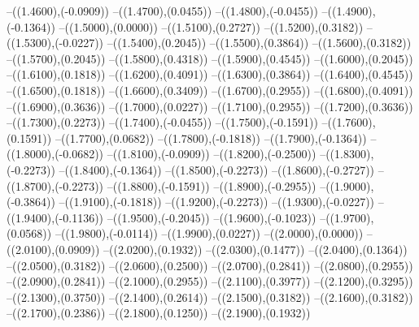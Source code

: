 {	--({\sx*(1.4600)},{\sy*(-0.0909)})
	--({\sx*(1.4700)},{\sy*(0.0455)})
	--({\sx*(1.4800)},{\sy*(-0.0455)})
	--({\sx*(1.4900)},{\sy*(-0.1364)})
	--({\sx*(1.5000)},{\sy*(0.0000)})
	--({\sx*(1.5100)},{\sy*(0.2727)})
	--({\sx*(1.5200)},{\sy*(0.3182)})
	--({\sx*(1.5300)},{\sy*(-0.0227)})
	--({\sx*(1.5400)},{\sy*(0.2045)})
	--({\sx*(1.5500)},{\sy*(0.3864)})
	--({\sx*(1.5600)},{\sy*(0.3182)})
	--({\sx*(1.5700)},{\sy*(0.2045)})
	--({\sx*(1.5800)},{\sy*(0.4318)})
	--({\sx*(1.5900)},{\sy*(0.4545)})
	--({\sx*(1.6000)},{\sy*(0.2045)})
	--({\sx*(1.6100)},{\sy*(0.1818)})
	--({\sx*(1.6200)},{\sy*(0.4091)})
	--({\sx*(1.6300)},{\sy*(0.3864)})
	--({\sx*(1.6400)},{\sy*(0.4545)})
	--({\sx*(1.6500)},{\sy*(0.1818)})
	--({\sx*(1.6600)},{\sy*(0.3409)})
	--({\sx*(1.6700)},{\sy*(0.2955)})
	--({\sx*(1.6800)},{\sy*(0.4091)})
	--({\sx*(1.6900)},{\sy*(0.3636)})
	--({\sx*(1.7000)},{\sy*(0.0227)})
	--({\sx*(1.7100)},{\sy*(0.2955)})
	--({\sx*(1.7200)},{\sy*(0.3636)})
	--({\sx*(1.7300)},{\sy*(0.2273)})
	--({\sx*(1.7400)},{\sy*(-0.0455)})
	--({\sx*(1.7500)},{\sy*(-0.1591)})
	--({\sx*(1.7600)},{\sy*(0.1591)})
	--({\sx*(1.7700)},{\sy*(0.0682)})
	--({\sx*(1.7800)},{\sy*(-0.1818)})
	--({\sx*(1.7900)},{\sy*(-0.1364)})
	--({\sx*(1.8000)},{\sy*(-0.0682)})
	--({\sx*(1.8100)},{\sy*(-0.0909)})
	--({\sx*(1.8200)},{\sy*(-0.2500)})
	--({\sx*(1.8300)},{\sy*(-0.2273)})
	--({\sx*(1.8400)},{\sy*(-0.1364)})
	--({\sx*(1.8500)},{\sy*(-0.2273)})
	--({\sx*(1.8600)},{\sy*(-0.2727)})
	--({\sx*(1.8700)},{\sy*(-0.2273)})
	--({\sx*(1.8800)},{\sy*(-0.1591)})
	--({\sx*(1.8900)},{\sy*(-0.2955)})
	--({\sx*(1.9000)},{\sy*(-0.3864)})
	--({\sx*(1.9100)},{\sy*(-0.1818)})
	--({\sx*(1.9200)},{\sy*(-0.2273)})
	--({\sx*(1.9300)},{\sy*(-0.0227)})
	--({\sx*(1.9400)},{\sy*(-0.1136)})
	--({\sx*(1.9500)},{\sy*(-0.2045)})
	--({\sx*(1.9600)},{\sy*(-0.1023)})
	--({\sx*(1.9700)},{\sy*(0.0568)})
	--({\sx*(1.9800)},{\sy*(-0.0114)})
	--({\sx*(1.9900)},{\sy*(0.0227)})
	--({\sx*(2.0000)},{\sy*(0.0000)})
	--({\sx*(2.0100)},{\sy*(0.0909)})
	--({\sx*(2.0200)},{\sy*(0.1932)})
	--({\sx*(2.0300)},{\sy*(0.1477)})
	--({\sx*(2.0400)},{\sy*(0.1364)})
	--({\sx*(2.0500)},{\sy*(0.3182)})
	--({\sx*(2.0600)},{\sy*(0.2500)})
	--({\sx*(2.0700)},{\sy*(0.2841)})
	--({\sx*(2.0800)},{\sy*(0.2955)})
	--({\sx*(2.0900)},{\sy*(0.2841)})
	--({\sx*(2.1000)},{\sy*(0.2955)})
	--({\sx*(2.1100)},{\sy*(0.3977)})
	--({\sx*(2.1200)},{\sy*(0.3295)})
	--({\sx*(2.1300)},{\sy*(0.3750)})
	--({\sx*(2.1400)},{\sy*(0.2614)})
	--({\sx*(2.1500)},{\sy*(0.3182)})
	--({\sx*(2.1600)},{\sy*(0.3182)})
	--({\sx*(2.1700)},{\sy*(0.2386)})
	--({\sx*(2.1800)},{\sy*(0.1250)})
	--({\sx*(2.1900)},{\sy*(0.1932)})
}
